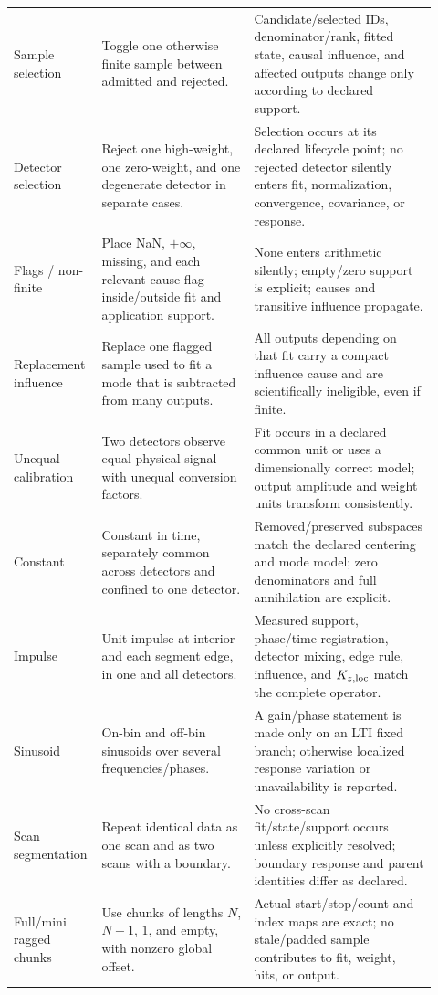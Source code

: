 \documentclass[11pt]{article}
\begin{document}
\begin{longtable}{>{\raggedright\arraybackslash}p{0.15\linewidth}
                  >{\raggedright\arraybackslash}p{0.35\linewidth}
                  >{\raggedright\arraybackslash}p{0.42\linewidth}}
Sample selection & Toggle one otherwise finite sample between admitted and
rejected. & Candidate/selected IDs, denominator/rank, fitted state, causal
influence, and affected outputs change only according to declared support.\\
Detector selection & Reject one high-weight, one zero-weight, and one
degenerate detector in separate cases. & Selection occurs at its declared
lifecycle point; no rejected detector silently enters fit, normalization,
convergence, covariance, or response.\\
Flags / non-finite & Place NaN, $+\infty$, missing, and each relevant cause flag
inside/outside fit and application support. & None enters arithmetic silently;
empty/zero support is explicit; causes and transitive influence propagate.\\
Replacement influence & Replace one flagged sample used to fit a mode that is
subtracted from many outputs. & All outputs depending on that fit carry a
compact influence cause and are scientifically ineligible, even if finite.\\
Unequal calibration & Two detectors observe equal physical signal with
unequal conversion factors. & Fit occurs in a declared common unit or uses a
dimensionally correct model; output amplitude and weight units transform
consistently.\\
Constant & Constant in time, separately common across detectors and confined
to one detector. & Removed/preserved subspaces match the declared centering
and mode model; zero denominators and full annihilation are explicit.\\
Impulse & Unit impulse at interior and each segment edge, in one and all
detectors. & Measured support, phase/time registration, detector mixing, edge
rule, influence, and $K_{z,\rm loc}$ match the complete operator.\\
Sinusoid & On-bin and off-bin sinusoids over several frequencies/phases. & A
gain/phase statement is made only on an LTI fixed branch; otherwise localized
response variation or unavailability is reported.\\
Scan segmentation & Repeat identical data as one scan and as two scans with a
boundary. & No cross-scan fit/state/support occurs unless explicitly resolved;
boundary response and parent identities differ as declared.\\
Full/mini ragged chunks & Use chunks of lengths $N$, $N-1$, $1$, and empty,
with nonzero global offset. & Actual start/stop/count and index maps are exact;
no stale/padded sample contributes to fit, weight, hits, or output.\\

\end{longtable}
\end{document}
